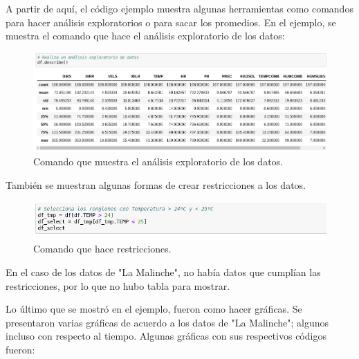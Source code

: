 \documentclass[a4paper]{article}
\begin{document}
A partir de aquí, el código ejemplo muestra algunas herramientas como comandos para hacer análisis exploratorios o para sacar los promedios. En el ejemplo, se muestra el comando que hace el análisis exploratorio de los datos: 
\begin{figure}[h!]
  \centering
  \includegraphics[width=0.3\linewidth]{df_Describe.png}
  \caption{Comando que muestra el análisis exploratorio de los datos.}
\end{figure}

También se muestran algunas formas de crear restricciones a los datos.

\begin{figure}[h!]
  \centering
  \includegraphics[width=0.3\linewidth]{df_tmp.png}
  \caption{Comando que hace restricciones.}
\end{figure}

En el caso de los datos de "La Malinche", no había datos que cumplían las restricciones, por lo que no hubo tabla para mostrar. 

Lo último que se mostró en el ejemplo, fueron como hacer gráficas. Se presentaron varias gráficas de acuerdo a los datos de "La Malinche"; algunos incluso con respecto al tiempo. Algunas gráficas con sus respectivos códigos fueron:
\end{document}
